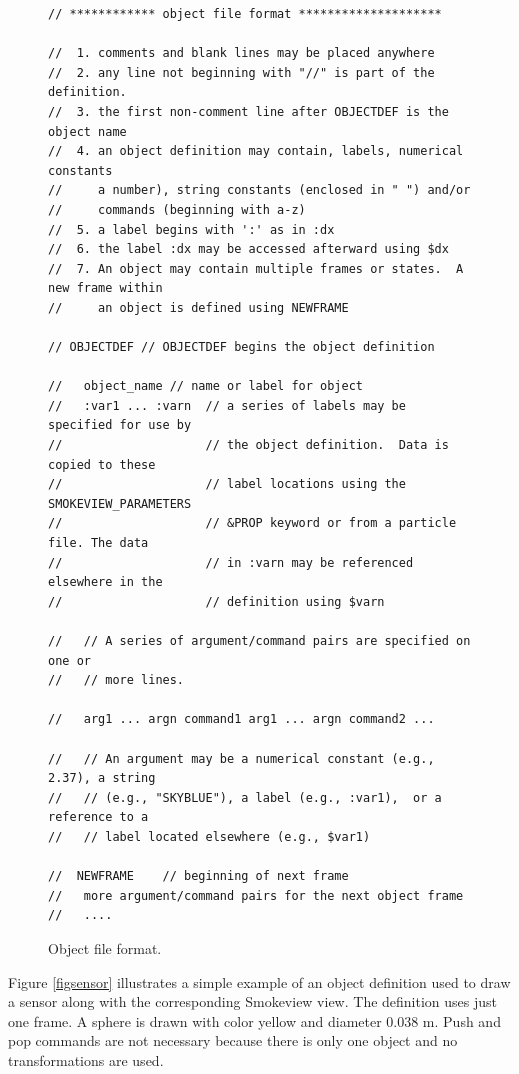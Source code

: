 \documentclass[11pt,twoside]{book}
\begin{document}
\begin{figure}[\figoptions]
{\small
\begin{lstlisting}[frame=single,rulecolor=\color{yellow},
framerule=1pt,framesep=1pc,fillcolor=\color{yellow}]
// ************ object file format ********************

//  1. comments and blank lines may be placed anywhere
//  2. any line not beginning with "//" is part of the definition.
//  3. the first non-comment line after OBJECTDEF is the object name
//  4. an object definition may contain, labels, numerical constants
//     a number), string constants (enclosed in " ") and/or
//     commands (beginning with a-z)
//  5. a label begins with ':' as in :dx
//  6. the label :dx may be accessed afterward using $dx
//  7. An object may contain multiple frames or states.  A new frame within
//     an object is defined using NEWFRAME

// OBJECTDEF // OBJECTDEF begins the object definition

//   object_name // name or label for object
//   :var1 ... :varn  // a series of labels may be specified for use by
//                    // the object definition.  Data is copied to these
//                    // label locations using the SMOKEVIEW_PARAMETERS
//                    // &PROP keyword or from a particle file. The data
//                    // in :varn may be referenced  elsewhere in the
//                    // definition using $varn

//   // A series of argument/command pairs are specified on one or
//   // more lines.

//   arg1 ... argn command1 arg1 ... argn command2 ...

//   // An argument may be a numerical constant (e.g., 2.37), a string
//   // (e.g., "SKYBLUE"), a label (e.g., :var1),  or a reference to a
//   // label located elsewhere (e.g., $var1)

//  NEWFRAME    // beginning of next frame
//   more argument/command pairs for the next object frame
//   ....
\end{lstlisting}
}
\caption{Object file format.}
\label{figobjectdef}%
\end{figure}

Figure \ref{figsensor} illustrates a simple example of an object definition used to draw a sensor along with the corresponding Smokeview view. The definition uses just one frame. A sphere is drawn with color yellow and diameter 0.038 m. Push and pop commands are not necessary because there is only one object and no transformations are used.
\end{document}
